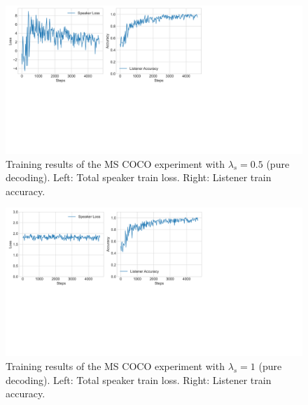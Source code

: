 \begin{figure}
	\centering
	\includegraphics[width=\linewidth]{images/shapes_refgame_49_pure_05_random.png}
	\caption{Training results of the MS COCO experiment with $\lambda_s = 0.5$ (pure decoding). Left: Total speaker train loss. Right: Listener train accuracy.}
	\label{fig:3dshapes_baseline_05_speaker_loss_listener_acc}
\end{figure}

\begin{figure}
	\centering
	\includegraphics[width=\linewidth]{images/shapes_refgame_49_pure_1_random.png}
	\caption{Training results of the MS COCO experiment with $\lambda_s = 1$ (pure decoding). Left: Total speaker train loss. Right: Listener train accuracy.}
	\label{fig:3dshapes_baseline_1_speaker_loss_listener_acc}
\end{figure}


